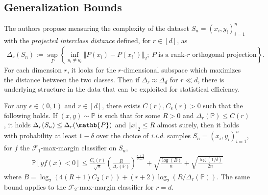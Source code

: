 \documentclass{article}
\newenvironment{manualtheorem}[1]{%
  \renewcommand\themanualtheoreminner{#1}%
  \manualtheoreminner
}{\endmanualtheoreminner}
\begin{document}
\subsection{Generalization Bounds}
The authors propose measuring the complexity of the dataset $S_n = (x_i, y_i)_{i=1}^n$ with the \textit{projected interclass distance} defined, for $r \in [d]$, as 
\begin{align*}
    \Delta_r(S_n) := \underset{P}{\sup}\left\{ \underset{y_i \neq y_i}{\inf} \Vert P(x_i) - P(x_i') \Vert_2; \ \text{$P$ is a rank-$r$ orthogonal projection} \right\}.
\end{align*}
For each dimension $r$, it looks for the $r$-dimensional subspace which maximizes the distance between the two classes. Then if $\Delta_r \approx \Delta_d$ for $r \ll d$, there is underlying structure in the data that can be exploited for statistical efficiency.

\begin{manualtheorem}{8}[Generalization Bound]
For any $\epsilon \in (0,1)$ and $r \in [d]$, there exists $C(r), C_{\epsilon}(r) > 0$ such that the following holds. If $(x, y) \sim \mathbb{P}$ is such that for some $R > 0$ and $\Delta_r(\mathbb{P}) \leq C(r)$, it holds $\Delta_r(S_n) \leq \Delta_r(\mathb{P})$ and $\Vert x \Vert_2 \leq R$ almost surely, then it holds with probability at least $1- \delta$ over the choice of \textit{i.i.d.} samples $S_n = (x_i, y_i)_{i=1}^n$, for $f$ the $\mathcal{F}_1$-max-margin classifier on $S_n$,
\begin{align*}
    \mathbb{P}[yf(x) < 0] \leq \frac{C_{\epsilon}(r)}{\sqrt{n}} \left( \frac{R}{\Delta_r(\mathbb{P})} \right)^{\frac{r+3}{2-\epsilon}} + \sqrt{\frac{\log(B)}{n}} + \sqrt{\frac{\log(1/\delta)}{2n}}
\end{align*}
where $B = \log_2(4(R+1)C_2(r)) + (r+2)\log_2(R/\Delta_r(\mathbb{P}))$. The same bound applies to the $\mathcal{F}_2$-max-margin classifier for $r=d$.
\end{manualtheorem}



\end{document}

